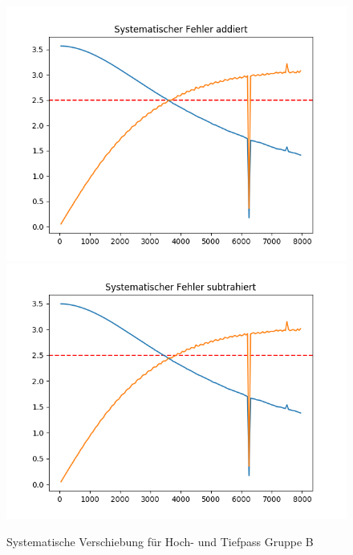 \documentclass[12pt,a4paper]{article}
\begin{document}
\begin{figure}[H]
\centering
\includegraphics[scale=0.5]{Bilder/HochTief_oben_B.png}
\includegraphics[scale=0.5]{Bilder/HochTief_unten_B.png}
\caption{Systematische Verschiebung für Hoch- und Tiefpass Gruppe B}
\end{figure}
\end{document}
